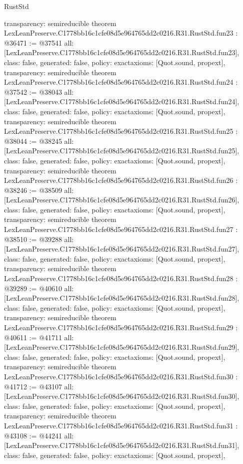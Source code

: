 \begin{lexlean}{RustStd}
\begin{coremodule}
{  transparency: semireducible
}
theorem LexLeanPreserve.C1778bb16c1cfe08d5e964765dd2c0216.R31.RustStd.fun23 : @36471 := @37541 {
  all: [LexLeanPreserve.C1778bb16c1cfe08d5e964765dd2c0216.R31.RustStd.fun23],
  class: false,
  generated: false,
  policy: exact{axioms: [Quot.sound, propext]},
  transparency: semireducible
}
theorem LexLeanPreserve.C1778bb16c1cfe08d5e964765dd2c0216.R31.RustStd.fun24 : @37542 := @38043 {
  all: [LexLeanPreserve.C1778bb16c1cfe08d5e964765dd2c0216.R31.RustStd.fun24],
  class: false,
  generated: false,
  policy: exact{axioms: [Quot.sound, propext]},
  transparency: semireducible
}
theorem LexLeanPreserve.C1778bb16c1cfe08d5e964765dd2c0216.R31.RustStd.fun25 : @38044 := @38245 {
  all: [LexLeanPreserve.C1778bb16c1cfe08d5e964765dd2c0216.R31.RustStd.fun25],
  class: false,
  generated: false,
  policy: exact{axioms: [Quot.sound, propext]},
  transparency: semireducible
}
theorem LexLeanPreserve.C1778bb16c1cfe08d5e964765dd2c0216.R31.RustStd.fun26 : @38246 := @38509 {
  all: [LexLeanPreserve.C1778bb16c1cfe08d5e964765dd2c0216.R31.RustStd.fun26],
  class: false,
  generated: false,
  policy: exact{axioms: [Quot.sound, propext]},
  transparency: semireducible
}
theorem LexLeanPreserve.C1778bb16c1cfe08d5e964765dd2c0216.R31.RustStd.fun27 : @38510 := @39288 {
  all: [LexLeanPreserve.C1778bb16c1cfe08d5e964765dd2c0216.R31.RustStd.fun27],
  class: false,
  generated: false,
  policy: exact{axioms: [Quot.sound, propext]},
  transparency: semireducible
}
theorem LexLeanPreserve.C1778bb16c1cfe08d5e964765dd2c0216.R31.RustStd.fun28 : @39289 := @40610 {
  all: [LexLeanPreserve.C1778bb16c1cfe08d5e964765dd2c0216.R31.RustStd.fun28],
  class: false,
  generated: false,
  policy: exact{axioms: [Quot.sound, propext]},
  transparency: semireducible
}
theorem LexLeanPreserve.C1778bb16c1cfe08d5e964765dd2c0216.R31.RustStd.fun29 : @40611 := @41711 {
  all: [LexLeanPreserve.C1778bb16c1cfe08d5e964765dd2c0216.R31.RustStd.fun29],
  class: false,
  generated: false,
  policy: exact{axioms: [Quot.sound, propext]},
  transparency: semireducible
}
theorem LexLeanPreserve.C1778bb16c1cfe08d5e964765dd2c0216.R31.RustStd.fun30 : @41712 := @43107 {
  all: [LexLeanPreserve.C1778bb16c1cfe08d5e964765dd2c0216.R31.RustStd.fun30],
  class: false,
  generated: false,
  policy: exact{axioms: [Quot.sound, propext]},
  transparency: semireducible
}
theorem LexLeanPreserve.C1778bb16c1cfe08d5e964765dd2c0216.R31.RustStd.fun31 : @43108 := @44241 {
  all: [LexLeanPreserve.C1778bb16c1cfe08d5e964765dd2c0216.R31.RustStd.fun31],
  class: false,
  generated: false,
  policy: exact{axioms: [Quot.sound, propext]},
}
\end{coremodule}
\end{lexlean}
